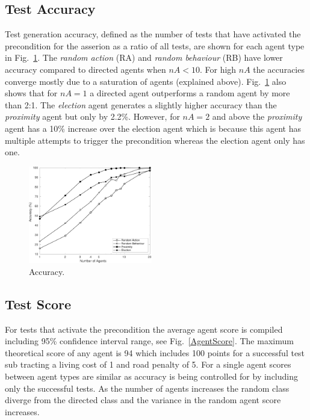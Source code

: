 \documentclass[letterpaper, 10 pt, journal, twoside]{IEEEtran}
\begin{document}
\subsection{Test Accuracy}
Test generation accuracy, defined as the number of tests that have activated the precondition for the asserion as a ratio of all tests, are shown for each agent type in Fig.~\ref{Accuracy}. The \textit{random action} (RA) and \textit{random behaviour} (RB) have lower accuracy compared to directed agents when $nA<10$. For high $nA$ the accuracies converge mostly due to a saturation of agents (explained above).
%
Fig.~\ref{Accuracy} also shows that for $nA=1$ a directed agent outperforms a random agent by more than 2:1. The \textit{election} agent generates a slightly higher accuracy than the \textit{proximity} agent but only by 2.2\%. However, for $nA=2$ and above the \textit{proximity} agent has a 10\% increase over the election agent which is because this agent has multiple attempts to trigger the precondition whereas the election agent only has one.


\begin{figure}[!t]
	\centering
\includegraphics[width=0.48\textwidth]{Accuracy.pdf}
	\caption{Accuracy.}
	\label{Accuracy}
\end{figure}



\subsection{Test Score} \label{testscore}
For tests that activate the precondition the average agent score is compiled including 95\% confidence interval range, see Fig.~\ref{AgentScore}. The maximum theoretical score of any agent is 94 which includes 100 points for a successful test sub tracting a living cost of 1 and road penalty of 5. For a single agent scores between agent types are similar as accuracy is being controlled for by including only the successful tests. As the number of agents increases the random class diverge from the directed class and the variance in the random agent score increases. 
\end{document}
